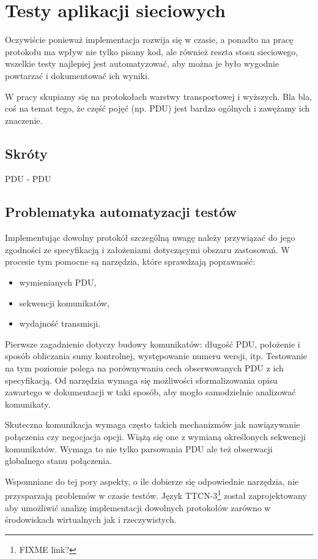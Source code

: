 \documentclass[00-praca-magisterska.tex]{subfiles}
\begin{document}
\chapter{Testy aplikacji sieciowych}


Oczywiście ponieważ implementacja rozwija się w czasie, a ponadto na pracę
protokołu ma wpływ nie tylko pisany kod, ale również reszta stosu sieciowego,
wszelkie testy najlepiej jest automatyzować, aby można je było wygodnie
powtarzać i dokumentować ich wyniki.

W pracy skupiamy się na protokołach warstwy transportowej i wyższych. Bla bla,
coś na temat tego, że część pojęć (np. PDU) jest bardzo ogólnych i zawężamy ich
znaczenie.

\section{Skróty}

PDU - PDU

\section{Problematyka automatyzacji testów}

Implementując dowolny protokół szczególną uwagę należy przywiązać do jego
zgodności ze specyfikacją i założeniami dotyczącymi obszaru zastosowań.
W procesie tym pomocne są narzędzia, które sprawdzają poprawność:
\begin{itemize}
  \item{wymienianych PDU,}
  \item{sekwencji komunikatów,}
  \item{wydajność transmisji.}
\end{itemize}

Pierwsze zagadnienie dotyczy budowy komunikatów: długość PDU, położenie i sposób
obliczania sumy kontrolnej, występowanie numeru wersji, itp. Testowanie na tym
poziomie polega na porównywaniu cech obserwowanych PDU z ich specyfikacją. Od
narzędzia wymaga się możliwości sformalizowania opisu zawartego w dokumentacji w
taki sposób, aby mogło samodzielnie analizować komunikaty.

Skuteczna komunikacja wymaga często takich mechanizmów jak nawiązywanie
połączenia czy negocjacja opcji. Wiążą się one z wymianą określonych sekwencji
komunikatów. Wymaga to nie tylko parsowania PDU ale też obserwacji globalnego
stanu połączenia.

Wspomniane do tej pory aspekty, o ile dobierze się odpowiednie narzędzia, nie
przysparzają problemów w czasie testów. Język TTCN-3\footnote{FIXME link?}
został zaprojektowany aby umożliwić analizę implementacji dowolnych protokołów
zarówno w środowiskach wirtualnych jak i rzeczywistych.
\end{document}
